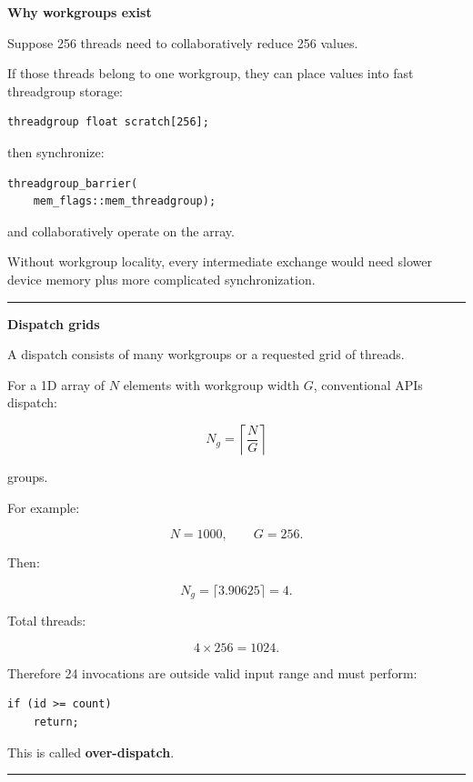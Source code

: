 \textbf{Why workgroups exist}

Suppose 256 threads need to collaboratively reduce 256 values.

If those threads belong to one workgroup, they can place values into fast threadgroup storage:

\protect{}\label{et2xom}%
\begin{verbatim}
threadgroup float scratch[256];
\end{verbatim}

then synchronize:

\protect{}\label{yx8mk8}%
\begin{verbatim}
threadgroup_barrier(
    mem_flags::mem_threadgroup);
\end{verbatim}

and collaboratively operate on the array.

Without workgroup locality, every intermediate exchange would need slower device memory plus more complicated synchronization.

\begin{center}\rule{0.5\linewidth}{0.5pt}\end{center}

\textbf{Dispatch grids}

A dispatch consists of many workgroups or a requested grid of threads.

For a 1D array of \(N\) elements with workgroup width \(G\), conventional APIs dispatch:

\[
\boxed{
N_g=
\left\lceil
\frac NG
\right\rceil
}
\]

groups.

For example:

\[
N=1000,
\qquad
G=256.
\]

Then:

\[
N_g=
\lceil3.90625\rceil
=
4.
\]

Total threads:

\[
4\times256=1024.
\]

Therefore 24 invocations are outside valid input range and must perform:

\protect{}\label{9wj2yb}%
\begin{verbatim}
if (id >= count)
    return;
\end{verbatim}

This is called \textbf{over-dispatch}.

\begin{center}\rule{0.5\linewidth}{0.5pt}\end{center}


